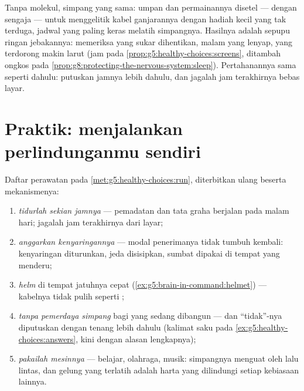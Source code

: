 \begin{example}\label{ex:g8:protecting-the-nervous-system:screens}
Tanpa molekul, simpang yang sama: umpan dan permainannya
disetel --- dengan sengaja --- untuk menggelitik kabel
ganjarannya dengan hadiah kecil yang tak terduga, jadwal
yang paling keras melatih simpangnya. Hasilnya adalah sepupu
ringan jebakannya: memeriksa yang sukar dihentikan, malam
yang lenyap,  yang terdorong makin larut (jam pada
\cref{prop:g5:healthy-choices:screens}, ditambah ongkos pada
\cref{prop:g8:protecting-the-nervous-system:sleep}).
Pertahanannya sama seperti dahulu: putuskan jamnya lebih
dahulu, dan jagalah jam terakhirnya bebas layar.
\end{example}

\section{Praktik: menjalankan perlindunganmu sendiri}

\begin{method}\label{met:g8:protecting-the-nervous-system:manual}
Daftar perawatan pada \cref{met:g5:healthy-choices:run},
diterbitkan ulang beserta mekanismenya:
\begin{enumerate}
  \item \emph{tidurlah sekian jamnya} --- pemadatan dan tata
        graha berjalan pada malam hari; jagalah jam
        terakhirnya dari layar;
  \item \emph{anggarkan kenyaringannya} --- modal
        penerimanya tidak tumbuh kembali: kenyaringan
        diturunkan, jeda disisipkan, sumbat  dipakai
        di tempat yang menderu;
  \item \emph{helm} di tempat jatuhnya cepat
        (\cref{ex:g5:brain-in-command:helmet}) --- kabelnya
        tidak pulih seperti ;
  \item \emph{tanpa pemerdaya simpang} bagi  yang sedang
        dibangun --- dan ``tidak''-nya diputuskan dengan
        tenang lebih dahulu (kalimat saku pada
        \cref{ex:g5:healthy-choices:answers}, kini dengan
        alasan lengkapnya);
  \item \emph{pakailah mesinnya} --- belajar, olahraga,
        musik: simpangnya menguat oleh lalu lintas, dan
        gelung yang terlatih adalah harta yang dilindungi
        setiap kebiasaan lainnya.
\end{enumerate}
\end{method}

